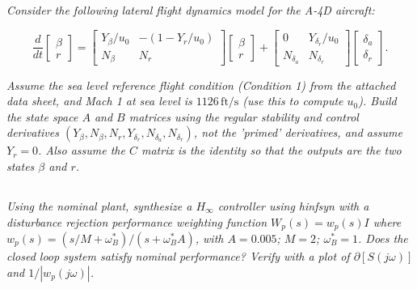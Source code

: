 \documentclass{article}
\begin{document}
\section{}

\textit{Consider the following lateral flight dynamics model for the A-4D aircraft:}

\[
\frac{d}{d t}
\begin{bmatrix}
\beta \\
r
\end{bmatrix}
=
\begin{bmatrix}
Y_\beta / u_0 & -\left(1 - Y_r / u_0\right) \\
N_\beta & N_r
\end{bmatrix}
\begin{bmatrix}
\beta \\
r
\end{bmatrix}
+
\begin{bmatrix}
0 & Y_{\delta_r} / u_0 \\
N_{\delta_a} & N_{\delta_r}
\end{bmatrix}
\begin{bmatrix}
\delta_a \\
\delta_r
\end{bmatrix}.
\]

\textit{Assume the sea level reference flight condition (Condition 1) from the attached data sheet, and Mach 1 at sea level is $1126 \, \text{ft/s}$ (use this to compute $u_0$). Build the state space $A$ and $B$ matrices using the regular stability and control derivatives $\left(Y_\beta, N_\beta, N_r, Y_{\delta_r}, N_{\delta_a}, N_{\delta_r}\right)$, not the 'primed' derivatives, and assume $Y_r = 0$. Also assume the $C$ matrix is the identity so that the outputs are the two states $\beta$ and $r$.}

\subsection{}

\textit{Using the nominal plant, synthesize a $H_{\infty}$ controller using hinfsyn with a disturbance rejection performance weighting function $W_p(s) = w_p(s) I$ where $w_p(s) = \left(s / M + \omega_B^*\right) / \left(s + \omega_B^* A\right)$, with $A = 0.005$; $M = 2$; $\omega_B^* = 1$. Does the closed loop system satisfy nominal performance? Verify with a plot of $\partial[S(j \omega)]$ and $1 / \left| w_p(j \omega) \right|$.}

\subsection{}
\end{document}
